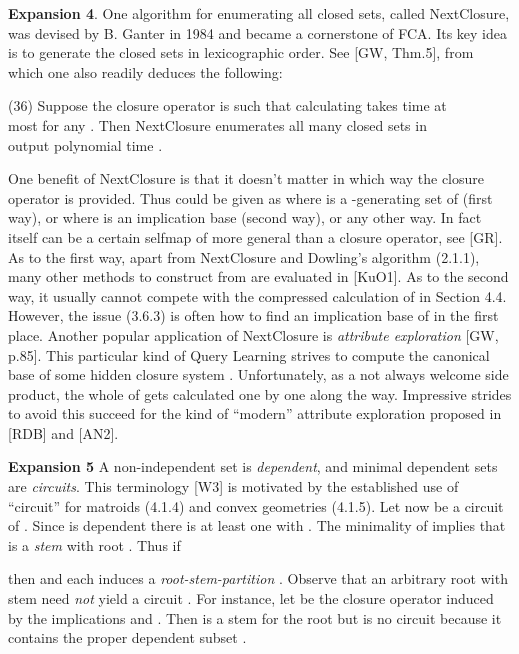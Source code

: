 \documentclass[11pt]{article}
\begin{document}
{\bf Expansion 4}. One algorithm for enumerating all closed sets, called NextClosure, was devised by B. Ganter in 1984 and became a cornerstone of FCA. Its key idea is to generate the closed sets in lexicographic order. See [GW, Thm.5], from which one also readily deduces the following:

(36) \quad Suppose the closure operator  is such that calculating  takes time at\\
\hspace*{.9cm} most  for any . Then NextClosure enumerates all  many closed sets in\\
\hspace*{.9cm} output polynomial time .

One benefit of NextClosure is that it doesn't matter in which way the closure operator  is provided. Thus  could be given as  where  is a -generating set of  (first way), or  where  is an implication base (second way), or any other way. In fact  itself can be a certain selfmap of  more general than a closure operator, see [GR]. 
As to the first way, apart from NextClosure and Dowling's algorithm (2.1.1), many other methods to construct  from  are evaluated in [KuO1]. As to the second way, it usually cannot compete with the compressed calculation of  in Section 4.4. However, the issue (3.6.3) is often how to find an implication base  of  in the first place. Another popular application of NextClosure is {\it attribute exploration} [GW, p.85]. This particular kind of Query Learning strives to compute the canonical base  of some hidden closure system . Unfortunately, as a not always welcome side product, the whole of  gets calculated one by one along the way. Impressive strides to avoid this succeed for the kind of ``modern'' attribute exploration proposed in [RDB] and [AN2]. 



{\bf Expansion 5} A non-independent set is {\it dependent}, and minimal dependent sets are {\it circuits}. This terminology [W3] is motivated by the established use of ``circuit'' for matroids (4.1.4) and convex geometries (4.1.5). Let now  be a circuit of . Since  is dependent there is at least one  with . The minimality of  implies that  is a {\it stem} with root . Thus if

then  and each  induces a {\it root-stem-partition} . Observe that an arbitrary root  with stem  need {\it not} yield a circuit . For instance, let  be the closure operator induced by the implications  and . Then  is a stem for the root  but  is no circuit because it contains the proper dependent subset .
\end{document}
